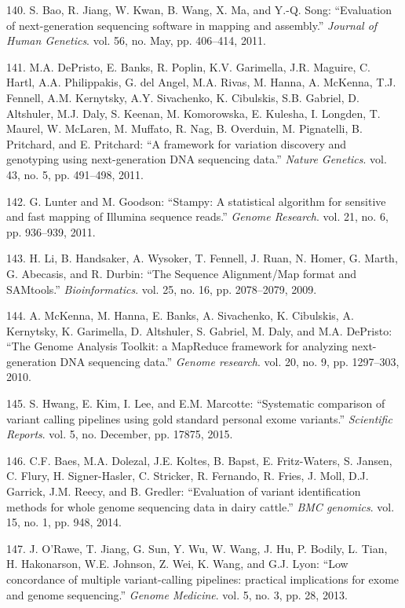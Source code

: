 \documentclass[12pt,a4paper,twoside]{ugathesis}
\theoremstyle{definition}
\theoremstyle{definition}
\theoremstyle{definition}
\theoremstyle{remark}
\begin{document}
\hypertarget{ref-Bao2011}{}
140. S. Bao, R. Jiang, W. Kwan, B. Wang, X. Ma, and Y.-Q. Song:
``Evaluation of next-generation sequencing software in mapping and
assembly.'' \emph{Journal of Human Genetics}. vol. 56, no. May, pp.
406--414, 2011.

\hypertarget{ref-DePristo2011}{}
141. M.A. DePristo, E. Banks, R. Poplin, K.V. Garimella, J.R. Maguire,
C. Hartl, A.A. Philippakis, G. del Angel, M.A. Rivas, M. Hanna, A.
McKenna, T.J. Fennell, A.M. Kernytsky, A.Y. Sivachenko, K. Cibulskis,
S.B. Gabriel, D. Altshuler, M.J. Daly, S. Keenan, M. Komorowska, E.
Kulesha, I. Longden, T. Maurel, W. McLaren, M. Muffato, R. Nag, B.
Overduin, M. Pignatelli, B. Pritchard, and E. Pritchard: ``A framework
for variation discovery and genotyping using next-generation DNA
sequencing data.'' \emph{Nature Genetics}. vol. 43, no. 5, pp. 491--498,
2011.

\hypertarget{ref-Lunter2011}{}
142. G. Lunter and M. Goodson: ``Stampy: A statistical algorithm for
sensitive and fast mapping of Illumina sequence reads.'' \emph{Genome
Research}. vol. 21, no. 6, pp. 936--939, 2011.

\hypertarget{ref-Li2009}{}
143. H. Li, B. Handsaker, A. Wysoker, T. Fennell, J. Ruan, N. Homer, G.
Marth, G. Abecasis, and R. Durbin: ``The Sequence Alignment/Map format
and SAMtools.'' \emph{Bioinformatics}. vol. 25, no. 16, pp. 2078--2079,
2009.

\hypertarget{ref-McKenna2010}{}
144. A. McKenna, M. Hanna, E. Banks, A. Sivachenko, K. Cibulskis, A.
Kernytsky, K. Garimella, D. Altshuler, S. Gabriel, M. Daly, and M.A.
DePristo: ``The Genome Analysis Toolkit: a MapReduce framework for
analyzing next-generation DNA sequencing data.'' \emph{Genome research}.
vol. 20, no. 9, pp. 1297--303, 2010.

\hypertarget{ref-Hwang2015}{}
145. S. Hwang, E. Kim, I. Lee, and E.M. Marcotte: ``Systematic
comparison of variant calling pipelines using gold standard personal
exome variants.'' \emph{Scientific Reports}. vol. 5, no. December, pp.
17875, 2015.

\hypertarget{ref-Baes2014}{}
146. C.F. Baes, M.A. Dolezal, J.E. Koltes, B. Bapst, E. Fritz-Waters, S.
Jansen, C. Flury, H. Signer-Hasler, C. Stricker, R. Fernando, R. Fries,
J. Moll, D.J. Garrick, J.M. Reecy, and B. Gredler: ``Evaluation of
variant identification methods for whole genome sequencing data in dairy
cattle.'' \emph{BMC genomics}. vol. 15, no. 1, pp. 948, 2014.

\hypertarget{ref-ORawe2013}{}
147. J. O'Rawe, T. Jiang, G. Sun, Y. Wu, W. Wang, J. Hu, P. Bodily, L.
Tian, H. Hakonarson, W.E. Johnson, Z. Wei, K. Wang, and G.J. Lyon: ``Low
concordance of multiple variant-calling pipelines: practical
implications for exome and genome sequencing.'' \emph{Genome Medicine}.
vol. 5, no. 3, pp. 28, 2013.
\end{document}
